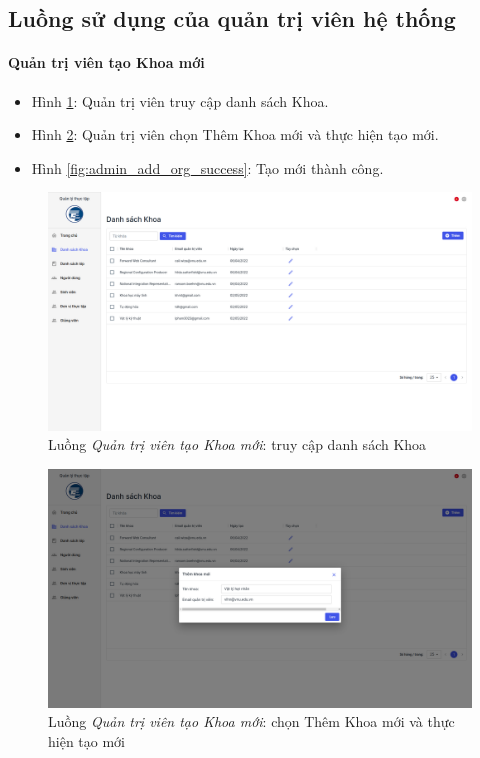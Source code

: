 \documentclass[./../main.tex]{subfiles}
\begin{document}
\subsection{Luồng sử dụng của quản trị viên hệ thống}

\paragraph*{Quản trị viên tạo Khoa mới}

\begin{itemize}
	\item Hình \ref{fig:admin_access_list_orgs}: Quản trị viên truy cập danh sách Khoa. 
	\item Hình \ref{fig:admin_add_org}: Quản trị viên chọn Thêm Khoa mới và thực hiện tạo mới.
	\item Hình \ref{fig:admin_add_org_success}: Tạo mới thành công.
\end{itemize}

\begin{figure}[]
	\includegraphics[width=\linewidth]{./images/image56.png}
	\caption{Luồng \emph{Quản trị viên tạo Khoa mới}: truy cập danh sách Khoa}
	\label{fig:admin_access_list_orgs}
\end{figure}

\begin{figure}[]
	\includegraphics[width=\linewidth]{./images/image57.png}
	\caption{Luồng \emph{Quản trị viên tạo Khoa mới}: chọn Thêm Khoa mới và thực hiện tạo mới}
	\label{fig:admin_add_org}
\end{figure}
\end{document}

